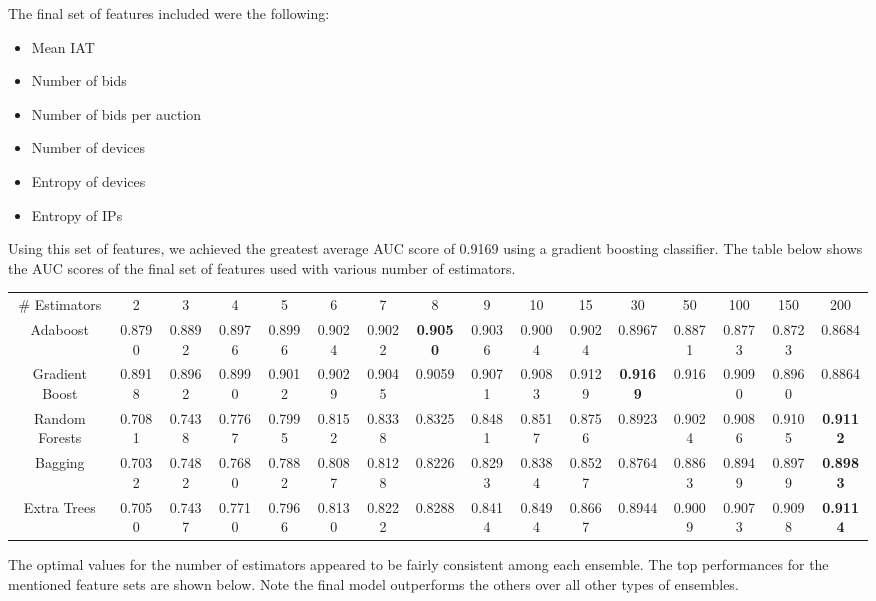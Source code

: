 \documentclass{article} %
\begin{document}
The final set of features included were the following:

\begin{itemize}
\item Mean IAT
\item Number of bids
\item Number of bids per auction
\item Number of devices
\item Entropy of devices
\item Entropy of IPs
\end{itemize}

Using this set of features, we achieved the greatest average AUC score of
0.9169 using a gradient boosting classifier. The table below shows the AUC scores of the final set of features used with various number of estimators.

\begin{adjustbox}{width=\textwidth,totalheight=\textheight,keepaspectratio}
\begin{tabular}{c | c c c c c c c c c c c c c c c}
\# Estimators & 2 & 3 & 4 & 5 & 6 & 7 & 8 & 9 & 10 & 15 & 30 & 50 & 100 & 150 & 200\\
Adaboost & 0.8790 & 0.8892 & 0.8976 & 0.8996 & 0.9024 & 0.9022 & \textbf{0.9050} & 0.9036 & 0.9004 & 0.9024 & 0.8967 & 0.8871 & 0.8773 & 0.8723 & 0.8684\\
\hline
Gradient Boost & 0.8918 & 0.8962 & 0.8990 & 0.9012 & 0.9029 & 0.9045 & 0.9059 & 0.9071 & 0.9083 & 0.9129 & \textbf{0.9169} & 0.916 & 0.9090 & 0.8960 & 0.8864\\
Random Forests & 0.7081 & 0.7438 & 0.7767 & 0.7995 & 0.8152 & 0.8338 & 0.8325 & 0.8481 & 0.8517 & 0.8756 & 0.8923 & 0.9024 & 0.9086 & 0.9105 & \textbf{0.9112}\\
Bagging & 0.7032 & 0.7482 & 0.7680 & 0.7882 & 0.8087 & 0.8128 & 0.8226 & 0.8293 & 0.8384 & 0.8527 & 0.8764 & 0.8863 & 0.8949 & 0.8979 & \textbf{0.8983}\\
Extra Trees & 0.7050 & 0.7437 & 0.7710 & 0.7966 & 0.8130 & 0.8222 & 0.8288 & 0.8414 & 0.8494 & 0.8667 & 0.8944 & 0.9009 & 0.9073 & 0.9098 & \textbf{0.9114}
\end{tabular}
\end{adjustbox}

The optimal values for the number of estimators appeared to be fairly consistent
among each ensemble. The top performances for the mentioned feature sets are
shown below. Note the final model outperforms the others over all other types of
ensembles.
\end{document}

